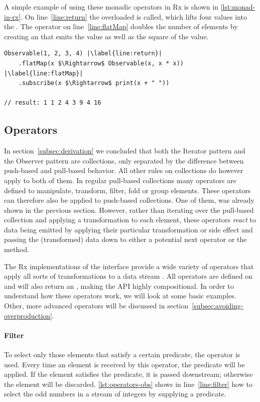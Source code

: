 A simple example of using these monadic operators in Rx is shown in \autoref{lst:monad-in-rx}. On line~\ref{line:return} the overloaded  is called, which lifts four values into the \obs. The  operator on line~\ref{line:flatMap} doubles the number of elements by creating an \obs that emits the value as well as the square of the value.

\begin{minipage}{\linewidth}
\begin{lstlisting}[style=ScalaStyle, caption={Monad operators in Rx}, label={lst:monad-in-rx}]
Observable(1, 2, 3, 4) |\label{line:return}|
    .flatMap(x $\Rightarrow$ Observable(x, x * x)) |\label{line:flatMap}|
    .subscribe(x $\Rightarrow$ print(x + " "))

// result: 1 1 2 4 3 9 4 16
\end{lstlisting}
\end{minipage}

\subsection{Operators}
\label{subsec:operators}
In section~\ref{subsec:derivation} we concluded that both the Iterator pattern and the Observer pattern are collections, only separated by the difference between push-based and pull-based behavior. All other rules on collections do however apply to both of them. In regular pull-based collections many operators are defined to manipulate, transform, filter, fold or group elements. These operators can therefore also be applied to push-based collections. One of them,  was already shown in the previous section. However, rather than iterating over the pull-based collection and applying a transformation to each element, these operators \emph{react} to data being emitted by applying their particular transformation or side effect and passing the (transformed) data down to either a potential next operator or the  method.

The Rx implementations of the \obs interface provide a wide variety of operators that apply all sorts of transformations to a data stream \cite{rx-api}. All operators are defined on \obs and will also return an \obs, making the API highly compositional. In order to understand how these operators work, we will look at some basic examples. Other, more advanced operators will be discussed in section~\ref{subsec:avoiding-overproduction}.

\paragraph{Filter}To select only those elements that satisfy a certain predicate, the operator  is used. Every time an element is received by this operator, the predicate  will be applied. If the element satisfies the predicate, it is passed downstream; otherwise the element will be discarded. \autoref{lst:operators-obs} shows in line~\ref{line:filter} how to select the odd numbers in a stream of integers by supplying a predicate.

